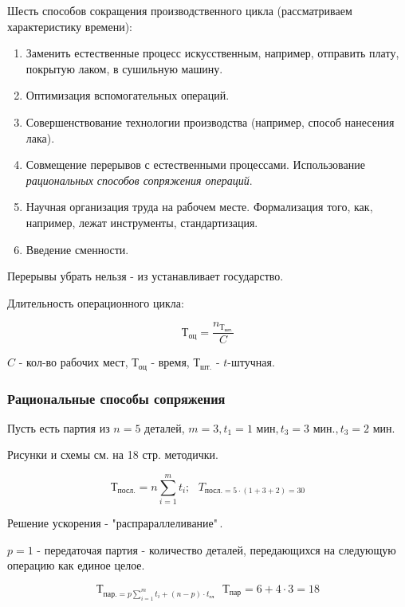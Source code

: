 Шесть способов сокращения производственного цикла (рассматриваем характеристику времени):

\begin{enumerate}
	\item Заменить естественные процесс искусственным, например, отправить плату, покрытую лаком, в сушильную машину.
	\item Оптимизация вспомогательных операций.
	\item Совершенствование технологии производства (например, способ нанесения лака).
	\item Совмещение перерывов с естественными процессами. Использование \textit{рациональных способов сопряжения операций}.
	\item Научная организация труда на рабочем месте. Формализация того, как, например, лежат инструменты, стандартизация.
	\item Введение сменности.
\end{enumerate}

\begin{remark}
	Перерывы убрать нельзя - из устанавливает государство.
\end{remark}

Длительность операционного цикла:

\[ \text{Т}_{\text{оц}} = \frac{n_{\text{Т}_{\text{шт.}}}}{C} \]

$C$ - кол-во рабочих мест, $\text{Т}_{\text{оц}}$ - время, $\text{Т}_{\text{шт.}}$ - $t$-штучная.

\subsubsection{Рациональные способы сопряжения}

Пусть есть партия из $n = 5$ деталей, $m = 3, t_1 = 1 \text{ мин}, t_3 = 3 \text{ мин.}, t_3 = 2 \text{ мин}$.

\begin{remark}
	Рисунки и схемы см. на 18 стр. методички.
\end{remark}

\[
\text{Т}_{\text{посл.}} = n \sum_{i=1}^{m} t_i; ~~~ T_{\text{посл.} = 5 \cdot (1 + 3 + 2) = 30}
\]

Решение ускорения - "распрараллеливание"\,.

$p = 1$ - передаточая партия - количество деталей, передающихся на следующую операцию как единое целое.

\[
\text{Т}_{\text{пар.} = p \sum\limits_{i=1}^{m} t_i + (n-p) \cdot t_{\text{гл}}} ~~~ \text{Т}_{\text{пар}} = 6 + 4 \cdot 3 = 18
\]

